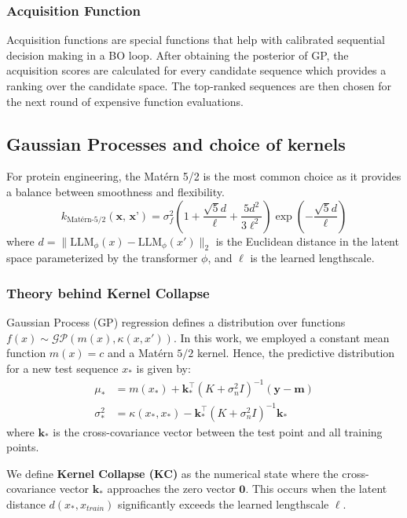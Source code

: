 \documentclass{article}
\theoremstyle{plain}
\theoremstyle{definition}
\theoremstyle{remark}
\begin{document}
\subsubsection{Acquisition Function}
Acquisition functions are special functions that help with calibrated sequential decision making in a BO loop. After obtaining the posterior of GP, the acquisition scores are calculated for every candidate sequence which provides a ranking over the candidate space. The top-ranked sequences are then chosen for the next round of expensive function evaluations. 

\subsection{Gaussian Processes and choice of kernels}
For protein engineering, the Matérn 5/2 is the most common choice as it provides a balance between smoothness and flexibility.
\begin{equation}
    k_{\text{Mat\'ern-5/2}}(\textbf{x, x'}) = \sigma_f^2 \left(1 + \frac{\sqrt{5}d}{\ell} + \frac{5d^2}{3\ell^2}\right) \exp\left(-\frac{\sqrt{5}d}{\ell}\right)
\end{equation}
where $d = \| \text{LLM}_\phi(x) - \text{LLM}_\phi(x') \|_2$ is the Euclidean distance in the latent space parameterized by the transformer $\phi$, and $\ell$ is the learned lengthscale.

\subsubsection{Theory behind Kernel Collapse}
Gaussian Process (GP) regression defines a distribution over functions $f(x) \sim \mathcal{GP}(m(x), \kappa(x, x'))$. In this work, we employed a constant mean function $m(x) = c$ and a Matérn $5/2$ kernel. Hence, the predictive distribution for a new test sequence $x_*$ is given by:
\begin{align}
    \mu_* &= m(x_*) + \mathbf{k}_*^\top (K + \sigma_n^2 I)^{-1} (\mathbf{y} - \mathbf{m}) \\
    \sigma^2_* &= \kappa(x_*, x_*) - \mathbf{k}_*^\top (K + \sigma_n^2 I)^{-1} \mathbf{k}_*
\end{align}
where $\mathbf{k}_*$ is the cross-covariance vector between the test point and all training points.

We define \textbf{Kernel Collapse (KC)} as the numerical state where the cross-covariance vector $\mathbf{k}_*$ approaches the zero vector $\mathbf{0}$. This occurs when the latent distance $d(x_*, x_{train})$ significantly exceeds the learned lengthscale $\ell$.
\end{document}
